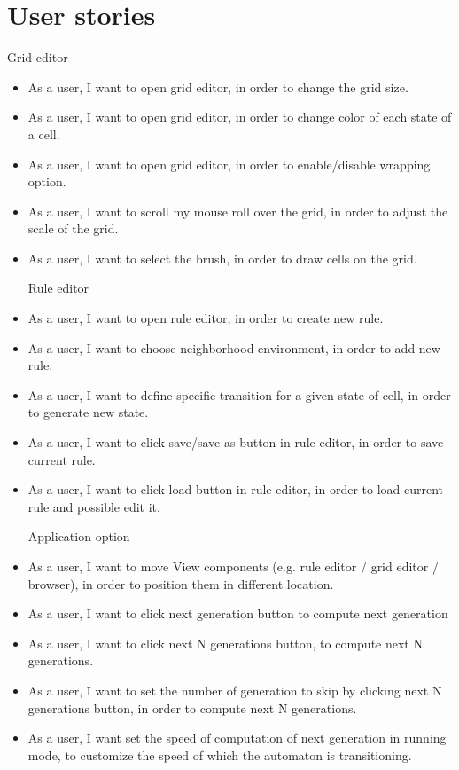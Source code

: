 \documentclass{article}
\begin{document}
\section{User stories}
	Grid editor
\begin{itemize}	
	\item 
		As a user, 
		I want to open grid editor,
		in order to change the grid size.

	\item 
		As a user, 
		I want to open grid editor,
		in order to change color of each state of a cell.

	\item 
		As a user, 
		I want to open grid editor,
		in order to enable/disable wrapping option.

	\item 
		As a user, 
		I want to scroll my mouse roll over the grid,
		in order to adjust the scale of the grid.

	\item 
		As a user, 
		I want to select the brush,
		in order to draw cells on the grid.

	\vspace{30pt}
	Rule editor
	
	\item 
		As a user,
		I want to open rule editor,
		in order to create new rule.
		
	\item 
		As a user,
		I want to choose neighborhood environment,
		in order to add new rule.
		
	\item 
		As a user,
		I want to define specific transition for a given state of cell,
		in order to generate new state.
		
	\item 
		As a user,
		I want to click save/save as button in rule editor,
		in order to save current rule.

	\item 
		As a user,
		I want to click load button in rule editor,
		in order to load current rule and possible edit it.

	\vspace{30pt}
	Application option
	
	\item 
		As a user,
		I want to move View components (e.g. rule editor / grid editor / browser),
		in order to position them in different location.
	\item 
		As a user,
		I want to click next generation button 
		to compute next generation
	\item 
		As a user,
		I want to click next N generations button,
		to compute next N generations.
	\item 
		As a user,
		I want to set the number of generation to skip by clicking next N generations button,
		in order to compute next N generations.
	\item 
		As a user,
		I want set the speed of computation of next generation in running mode,
		to customize the speed of which the automaton is transitioning. \\
		

\end{itemize}
\end{document}
